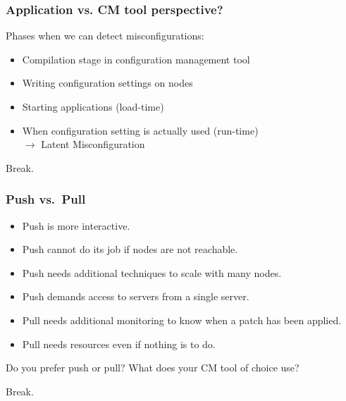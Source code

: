 \begin{frame}
	\frametitle{Application vs. CM tool perspective?}

	\pause

	Phases when we can detect misconfigurations:
	\begin{itemize} %
	\item Compilation stage in configuration management tool
	\item Writing configuration settings on nodes
	\item Starting applications (load-time)
	\item When configuration setting is actually used (run-time) \\
		$\rightarrow$ Latent Misconfiguration
	\end{itemize}
\end{frame}

\begin{assignment}
	\begin{task}
	Break.
	\end{task}
\end{assignment}

\begin{frame}
	\frametitle{Push vs.\ Pull}

	\pause

	\begin{itemize} %
	\item Push is more interactive.
	\item Push cannot do its job if nodes are not reachable.
	\item Push needs additional techniques to scale with many nodes.
	\item Push demands access to servers from a single server.
	\item Pull needs additional monitoring to know when a patch has been applied.
	\item Pull needs resources even if nothing is to do.
	\end{itemize}

	\pause[\thebeamerpauses]

	\begin{task}
	Do you prefer push or pull?
	What does your CM tool of choice use?
	\end{task}
\end{frame}

\begin{assignment}
	\begin{task}
	Break.
	\end{task}
\end{assignment}


